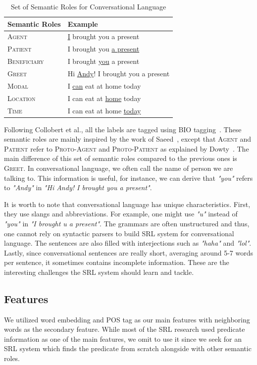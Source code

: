 \begin{table}
	\caption{Set of Semantic Roles for Conversational Language}
	\label{tab:semantic_roles}
	\begin{tabular}{ll}
		\toprule
		Semantic Roles		&Example\\
		\midrule
		\textsc{Agent}		& \underline{I} brought you a present\\
		\textsc{Patient}		& I brought you \underline{a present}\\
		\textsc{Beneficiary}	& I brought \underline{you} a present\\
		\textsc{Greet} 				& Hi \underline{Andy}! I brought you a present\\
		\textsc{Modal} 				& I \underline{can} eat at home today \\
		\textsc{Location} 			& I can eat at \underline{home} today \\
		\textsc{Time} 				& I can eat at home \underline{today} \\
		\bottomrule
	\end{tabular}
\end{table}

Following Collobert et al., all the labels are tagged using BIO tagging~\cite{collobert2011natural}. These semantic roles are mainly inspired by the work of Saeed~\cite{saeed19972003}, except that \textsc{Agent} and \textsc{Patient} refer to \textsc{Proto-Agent} and \textsc{Proto-Patient} as explained by Dowty~\cite{dowty1991thematic}. The main difference of this set of semantic roles compared to the previous ones is \textsc{Greet}. In conversational language, we often call the name of person we are talking to. This information is useful, for instance, we can derive that \textit{"you"} refers to \textit{"Andy"} in \textit{"Hi Andy! I brought you a present"}.

It is worth to note that conversational language has unique characteristics. First, they use slangs and abbreviations. For example, one might use \textit{"u"} instead of \textit{"you"} in \textit{"I brought u a present"}. The grammars are often unstructured and thus, one cannot rely on syntactic parsers to build SRL system for conversational language. The sentences are also filled with interjections such as \textit{"haha"} and \textit{"lol"}. Lastly, since conversational sentences are really short, averaging around 5-7 words per sentence, it sometimes contains incomplete information. These are the interesting challenges the SRL system should learn and tackle.

\subsection{Features}
We utilized word embedding and POS tag as our main features with neighboring words as the secondary feature. While most of the SRL research used predicate information as one of the main features, we omit to use it since we seek for an SRL system which finds the predicate from scratch alongside with other semantic roles.

